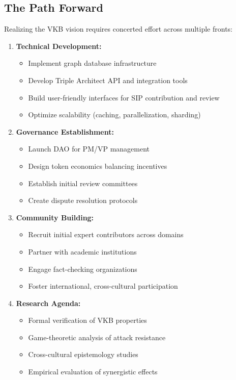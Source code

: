 \documentclass[11pt,a4paper]{article}
\theoremstyle{definition}
\theoremstyle{remark}
\newcommand{\VKB}{\textsc{VKB}}
\newcommand{\SIP}{\textsc{SIP}}
\newcommand{\DAO}{\textsc{DAO}}
\begin{document}
\subsection{The Path Forward}

Realizing the \VKB{} vision requires concerted effort across multiple fronts:

\begin{enumerate}
    \item \textbf{Technical Development:}
    \begin{itemize}
        \item Implement graph database infrastructure
        \item Develop Triple Architect API and integration tools
        \item Build user-friendly interfaces for \SIP{} contribution and review
        \item Optimize scalability (caching, parallelization, sharding)
    \end{itemize}
    
    \item \textbf{Governance Establishment:}
    \begin{itemize}
        \item Launch \DAO{} for PM/VP management
        \item Design token economics balancing incentives
        \item Establish initial review committees
        \item Create dispute resolution protocols
    \end{itemize}
    
    \item \textbf{Community Building:}
    \begin{itemize}
        \item Recruit initial expert contributors across domains
        \item Partner with academic institutions
        \item Engage fact-checking organizations
        \item Foster international, cross-cultural participation
    \end{itemize}
    
    \item \textbf{Research Agenda:}
    \begin{itemize}
        \item Formal verification of \VKB{} properties
        \item Game-theoretic analysis of attack resistance
        \item Cross-cultural epistemology studies
        \item Empirical evaluation of synergistic effects
    \end{itemize}
    

\end{enumerate}
\end{document}
